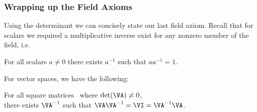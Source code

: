 \documentclass{beamer}
\begin{document}
\begin{frame}
\frametitle{Wrapping up the Field Axioms}
Using the determinant we can concisely state our last field axiom. Recall that for scalars we required a multiplicative inverse exist for any nonzero member of the field, i.e.
\begin{center}
	For all scalars $a\ne 0$ there exists $a^{-1}$ such that $aa^{-1} = 1$.
\end{center}
\pause
For vector spaces, we have the following:
\begin{center}
	For all square matrices \VA\ where $\det(\VA)\ne 0$,\\there exists $\VA^{-1}$ such that $\VA\VA^{-1} = \VI = \VA^{-1}\VA$.
\end{center}

\end{frame}
\end{document}
